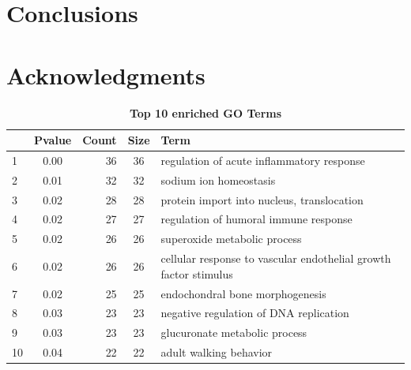 \documentclass[9pt,twocolumn,twoside]{gsajnl}
\begin{document}
\section*{Conclusions}

\section*{Acknowledgments}

\begin{table}[ht]
\centering
\caption{\bf Top 10 enriched GO Terms}
\begin{tableminipage}{\textwidth}
\begin{tabular}{lcrcp{3cm}}
  \hline
 & Pvalue & Count & Size & Term\\ 
  \hline
1 & 0.00 &  36 &  36 & regulation of acute inflammatory response\\ 
  2 & 0.01 &  32 &  32 & sodium ion homeostasis \\ 
  3 & 0.02 &  28 &  28 & protein import into nucleus, translocation\\ 
  4 & 0.02 &  27 &  27 & regulation of humoral immune response\\ 
  5 & 0.02 &  26 &  26 & superoxide metabolic process \\ 
  6 & 0.02&  26 &  26 & cellular response to vascular endothelial growth factor stimulus\\ 
  7 & 0.02 &  25 &  25 & endochondral bone morphogenesis\\ 
  8 & 0.03 &  23 &  23 & negative regulation of DNA replication\\ 
  9 & 0.03 &  23 &  23 & glucuronate metabolic process\\ 
  10& 0.04 &  22 &  22 & adult walking behavior\\ 
   \hline
\end{tabular}
\end{tableminipage}
\label{table}
\end{table}

\end{document}
